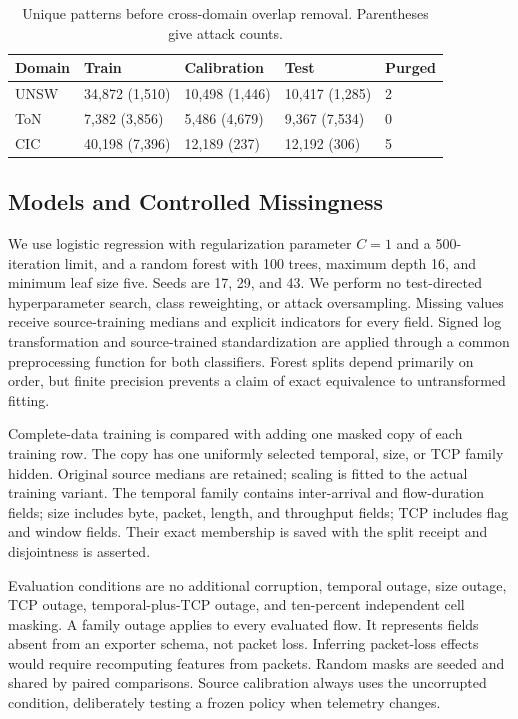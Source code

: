 \documentclass[manuscript,screen,nonacm]{acmart}
\begin{document}
\begin{table}[t]
\centering
\caption{Unique patterns before cross-domain overlap removal. Parentheses give attack counts.}
\begin{tabular}{lllll}
\toprule
Domain & Train & Calibration & Test & Purged \\
\midrule
UNSW & 34,872 (1,510) & 10,498 (1,446) & 10,417 (1,285) & 2 \\
ToN & 7,382 (3,856) & 5,486 (4,679) & 9,367 (7,534) & 0 \\
CIC & 40,198 (7,396) & 12,189 (237) & 12,192 (306) & 5 \\
\bottomrule
\end{tabular}
\end{table}

\subsection{Models and Controlled Missingness}
We use logistic regression with regularization parameter $C=1$ and a 500-iteration limit, and a random forest with 100 trees, maximum depth 16, and minimum leaf size five. Seeds are 17, 29, and 43. We perform no test-directed hyperparameter search, class reweighting, or attack oversampling. Missing values receive source-training medians and explicit indicators for every field. Signed log transformation and source-trained standardization are applied through a common preprocessing function for both classifiers. Forest splits depend primarily on order, but finite precision prevents a claim of exact equivalence to untransformed fitting.

Complete-data training is compared with adding one masked copy of each training row. The copy has one uniformly selected temporal, size, or TCP family hidden. Original source medians are retained; scaling is fitted to the actual training variant. The temporal family contains inter-arrival and flow-duration fields; size includes byte, packet, length, and throughput fields; TCP includes flag and window fields. Their exact membership is saved with the split receipt and disjointness is asserted.

Evaluation conditions are no additional corruption, temporal outage, size outage, TCP outage, temporal-plus-TCP outage, and ten-percent independent cell masking. A family outage applies to every evaluated flow. It represents fields absent from an exporter schema, not packet loss. Inferring packet-loss effects would require recomputing features from packets. Random masks are seeded and shared by paired comparisons. Source calibration always uses the uncorrupted condition, deliberately testing a frozen policy when telemetry changes.
\end{document}
